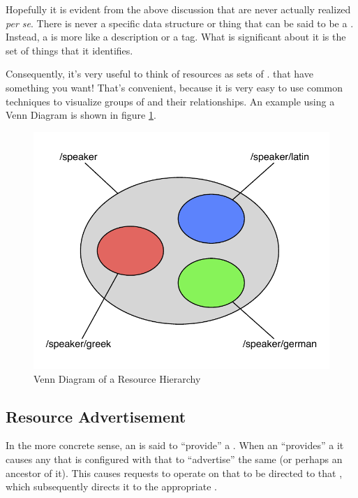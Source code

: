 Hopefully it is evident from the above discussion that \resources{} are never actually realized \emph{per se}.  There is never a specific data structure or thing that can be said to be a \resource.  Instead, a \resource{} is more like a description or a tag.  What is significant about it is the set of things that it identifies.

Consequently, it's very useful to think of resources as sets of \agents{}.  \Agents{} that have something you want!  That's convenient, because it is very easy to use common techniques to visualize groups of \agents{} and their relationships.  An example using a Venn Diagram is shown in figure \ref{fig:res-example1}.

\begin{figure}
	\begin{center}\includegraphics[width=\myfigwidth,height=\myfigheight,keepaspectratio]{figs/omnigraffle/res_example1}\end{center}
	\caption{Venn Diagram of a Resource Hierarchy}\label{fig:res-example1}
\end{figure}

\subsection{Resource Advertisement}


In the more concrete sense, an \actor{} is said to ``provide'' a \resource{}.  When an \actor{} ``provides'' a \resource{} it causes any \agent{} that is configured with that \actor{} to ``advertise'' the same \resource{} (or perhaps an ancestor of it).  This causes requests to operate on that \resource{} to be directed to that \agent{}, which subsequently directs it to the appropriate \actor{}.

